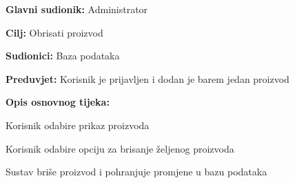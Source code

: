 					\noindent {}
					\begin{packed_item}
						
						\item \textbf{Glavni sudionik:} Administrator
						\item  \textbf{Cilj:} Obrisati proizvod
						\item  \textbf{Sudionici:} Baza podataka
						\item  \textbf{Preduvjet:} Korisnik je prijavljen i dodan je barem jedan proizvod
						\item  \textbf{Opis osnovnog tijeka:}
						
						\item[] \begin{packed_enum}
							
							\item Korisnik odabire prikaz proizvoda
							\item Korisnik odabire opciju za brisanje željenog proizvoda
							\item Sustav briše proizvod i pohranjuje promjene u bazu podataka
							
						\end{packed_enum}
							
						
					\end{packed_item}
				
